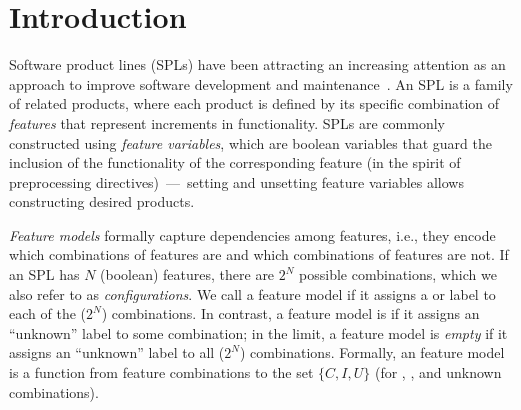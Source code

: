 \section{Introduction}

Software product lines (SPLs) have been attracting an increasing
attention as an approach to improve software development and
maintenance~\cite{cmu-sei-website, software-product-line-engineering}.
An SPL is a family of related products, where each product is defined
by its specific combination of \emph{features} that represent
increments in functionality.  SPLs are commonly constructed using
\emph{feature variables}, which are boolean variables that guard the
inclusion of the functionality of the corresponding feature (in the
spirit of  preprocessing
directives)~\cite{ahead-tool-suite, czarnecki-2000}---~setting and
unsetting feature variables allows constructing desired
products.


\emph{Feature models} formally capture dependencies among
features, i.e., they encode which combinations of features are \consistent{}
and which combinations of features are not.  If an SPL has $N$
(boolean) features, there are $2^N$ possible combinations, which we
also refer to as \emph{configurations}.  We call a feature model
\emph{\complete} if it assigns a \consistent{} or \inconsistent{} label to each of the
($2^N$) combinations.  In contrast, a feature model is
\emph{\incomplete} if it assigns an ``unknown'' label to some
combination; in the limit, a feature model is \emph{empty} if it
assigns an ``unknown'' label to all ($2^N$) combinations. Formally, an
\incomplete{} feature model is a function from feature combinations to
the set $\{C,I,U\}$ (for \consistent{}, \inconsistent{}, and unknown combinations).

